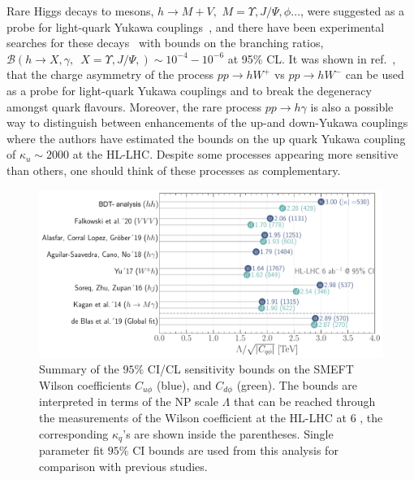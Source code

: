 Rare Higgs decays to mesons, $h \to M +V ,\, \, M = \Upsilon, J/\Psi, \phi\dots$, were suggested as a probe for light-quark Yukawa couplings~\cite{Bodwin:2013gca,Kagan:2014ila,Konig:2015qat}, and there have been experimental searches for these decays~\cite{ATLAS-CONF-2021-021,CMS:2018gcm} with bounds on the branching ratios, $\mathcal{B} (h \to X, \gamma, \,\,\, X =\Upsilon, J/\Psi,  ) \sim 10^{-4} - 10^{-6}$ at 95\% CL. It was shown in ref.~\cite{Yu:2017vul}, that the charge asymmetry of the process $pp \to h W^+$ vs $ pp \to h W^-$ can be used as a probe for light-quark Yukawa couplings and to break the degeneracy amongst quark flavours. Moreover, the rare process $ pp \to h \gamma$ is also a possible way to distinguish between enhancements of the up-and down-Yukawa couplings~\cite{Aguilar-Saavedra:2020rgo} where the authors have estimated the bounds on the up quark Yukawa coupling of $\kappa_u\sim 2000$ at the HL-LHC. Despite some processes appearing more sensitive than others, one should think of these processes as complementary. 
\begin{figure}[t!]
	\includegraphics[width=\linewidth]{figures/ueberblick_ly.pdf}
	\caption{Summary of the $95\%$ CI/CL sensitivity bounds on the SMEFT Wilson coefficients $C_{u\phi}$ (blue), and $C_{d\phi}$ (green). The bounds are interpreted in terms of the NP scale $\Lambda$ that can be reached through the measurements of the Wilson coefficient at the HL-LHC at $6$ \invab, the corresponding $\kappa_q$'s are shown inside the parentheses. Single parameter fit $95\%$ CI bounds are used from this analysis for comparison with previous studies.}
	\label{fig:comparison}
\end{figure}
